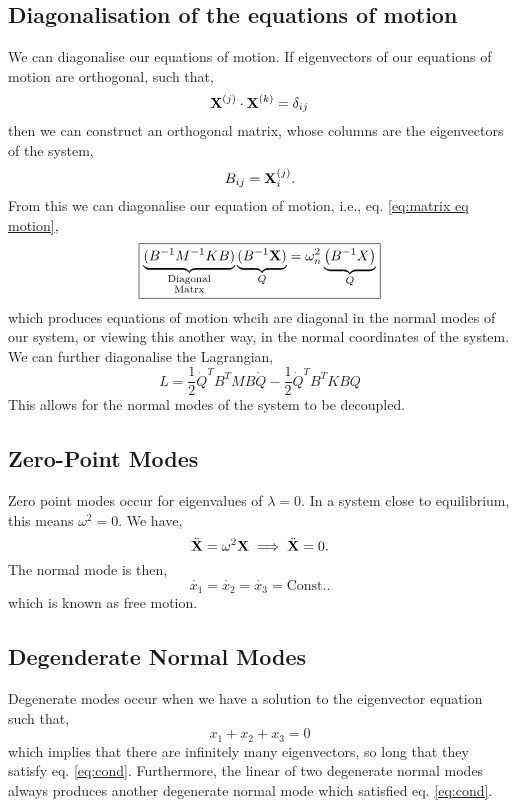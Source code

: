 \documentclass{book}
\begin{document}
\subsection{Diagonalisation of the equations of motion}
We can diagonalise our equations of motion. If eigenvectors of our equations of motion are orthogonal, such that,
\begin{equation}
	\vb{X}^{(j)}\cdot\vb{X}^{(k)} = \delta_{ij}
\end{equation}
then we can construct an orthogonal matrix, whose columns are the eigenvectors of the system,
\begin{equation}
	B_{ij} = \vb{X}_i^{(j)}.
\end{equation}
From this we can diagonalise our equation of motion, i.e., eq. \eqref{eq:matrix eq motion},
\begin{equation}
	\boxed{\underbrace{(B^{-1}M^{-1}KB)}_{\substack{\text{Diagonal}\\\text{Matrx}}}\underbrace{(B^{-1}\vb{X})}_{Q} = \omega_n^2 \underbrace{\left(B^{-1}X\right)}_{Q}}
\end{equation}
which produces equations of motion whcih are diagonal in the normal modes of our system, or viewing this another way, in the normal coordinates of the system. We can further diagonalise the Lagrangian,
\begin{equation}
	\boxed{L = \frac{1}{2}\Dot{Q}^TB^TMB\Dot{Q} - \frac{1}{2}\Dot{Q}^TB^TKBQ}
\end{equation}
This allows for the normal modes of the system to be decoupled.
\subsection{Zero-Point Modes}
Zero point modes occur for eigenvalues of $\lambda = 0$. In a system close to equilibrium, this means $\omega^2 = 0$. We have,
\begin{equation}
	\Ddot{\vb{X}} = \omega^2\vb{X} \implies \Ddot{\vb{X}} = 0.
\end{equation}
The normal mode is then,
\begin{equation}
	\Dot{x_1} = \Dot{x_2} = \Dot{x_3} = \text{Const.}.
\end{equation}
which is known as free motion.
\subsection{Degenderate Normal Modes}
Degenerate modes occur when we have a solution to the eigenvector equation such that,
\begin{equation}
	x_1 + x_2 + x_3 = 0 \label{eq:cond}
\end{equation}
which implies that there are infinitely many eigenvectors, so long that they satisfy eq. \eqref{eq:cond}. Furthermore, the linear of two degenerate normal modes always produces another degenerate normal mode which satisfied eq. \eqref{eq:cond}.
\end{document}
